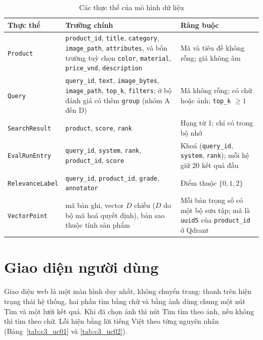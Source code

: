 \begin{table}[!htbp]
\centering
\caption{Các thực thể của mô hình dữ liệu}
\label{tab:c3_thucthe}
\footnotesize
\renewcommand{\arraystretch}{1.0}
\begin{tabularx}{\textwidth}{@{}p{3.1cm} >{\raggedright\arraybackslash}X >{\raggedright\arraybackslash}X@{}}
\toprule
\textbf{Thực thể} & \textbf{Trường chính} & \textbf{Ràng buộc} \\
\midrule
\texttt{Product} & \texttt{product\_id}, \texttt{title}, \texttt{category}, \texttt{image\_path}, \texttt{attributes}, và bốn trường tuỳ chọn \texttt{color}, \texttt{material}, \texttt{price\_vnd}, \texttt{description} & Mã và tiêu đề không rỗng; giá không âm \\
\texttt{Query} & \texttt{query\_id}, \texttt{text}, \texttt{image\_bytes}, \texttt{image\_path}, \texttt{top\_k}, \texttt{filters}; ở bộ đánh giá có thêm \texttt{group} (nhóm A đến D) & Mã không rỗng; có chữ hoặc ảnh; \texttt{top\_k} $\geq 1$ \\
\texttt{SearchResult} & \texttt{product}, \texttt{score}, \texttt{rank} & Hạng từ 1; chỉ có trong bộ nhớ \\
\texttt{EvalRunEntry} & \texttt{query\_id}, \texttt{system}, \texttt{rank}, \texttt{product\_id}, \texttt{score} & Khoá (\texttt{query\_id}, \texttt{system}, \texttt{rank}); mỗi hệ giữ 20 kết quả đầu \\
\texttt{RelevanceLabel} & \texttt{query\_id}, \texttt{product\_id}, \texttt{grade}, \texttt{annotator} & Điểm thuộc $\{0, 1, 2\}$ \\
\texttt{VectorPoint} & mã bản ghi, vector $D$ chiều ($D$ do bộ mã hoá quyết định), bản sao thuộc tính sản phẩm & Mỗi bản trọng số có một bộ sưu tập; mã là \texttt{uuid5} của \texttt{product\_id} ở Qdrant \\
\bottomrule
\end{tabularx}
\end{table}

\section{Giao diện người dùng}
\label{sec:giao-dien}

Giao diện web là một màn hình duy nhất, không chuyển trang: thanh trên hiện trạng thái hệ thống, hai phần tìm bằng chữ và bằng ảnh dùng chung một nút Tìm và một lưới kết quả. Khi đã chọn ảnh thì nút Tìm tìm theo ảnh, nếu không thì tìm theo chữ. Lỗi hiện bằng lời tiếng Việt theo từng nguyên nhân (Bảng~\ref{tab:c3_uc01} và \ref{tab:c3_uc02}).
